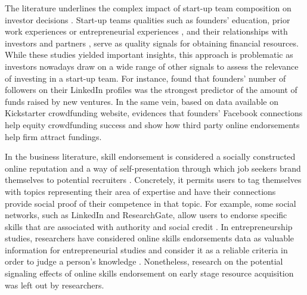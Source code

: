 \documentclass[12pt]{article}
\begin{document}
The literature underlines the complex impact of start-up team composition on investor decisions \citep{ghassemiautomated}. Start-up teams qualities such as founders' education, prior work experiences or entrepreneurial experiences \citep{shane2002network, hsu2007experienced}, and their relationships with investors and partners \citep{huang2017resources}, serve as quality signals for obtaining financial resources. While these studies yielded important insights, this approach is problematic as investors nowadays draw on a wide range of other signals to assess the relevance of investing in a start-up team. For instance, \citet{banerji2019startup} found that founders' number of followers on their LinkedIn profiles was the strongest predictor of the amount of funds raised by new ventures. In the same vein, based on data available on Kickstarter crowdfunding website, \citet{mollick2014dynamics} evidences that founders' Facebook connections help equity crowdfunding success and \citet{courtney2017resolving} show how third party online endorsements help firm attract fundings.

In the business literature, skill endorsement is considered a socially constructed online reputation and a way of self-presentation through which job seekers brand themselves to potential recruiters \citep{rapanta2017linkedin}. Concretely, it permits users to tag themselves with topics representing their area of expertise and have their connections provide social proof of their competence in that topic. For example, some social networks, such as LinkedIn and ResearchGate, allow users to endorse specific skills that are associated with authority and social credit \citep{perez2016endorsement, wu2018analysis}. In entrepreneurship studies, researchers have considered online skills endorsements data as valuable information for entrepreneurial studies and consider it as a reliable criteria in order to judge a person’s knowledge \citep{reese2020should, sako2020scaling}. Nonetheless, research on the potential signaling effects of online skills endorsement on early stage resource acquisition was left out by researchers.
\end{document}
